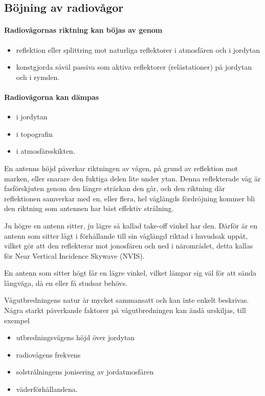\newpage %

\subsection{Böjning av radiovågor}

\paragraph{Radiovågornas riktning kan böjas av genom}
\begin{itemize}
  \item reflektion eller splittring mot naturliga reflektorer i
  atmosfären och i jordytan
  \item konstgjorda såväl passiva som aktiva reflektorer (relästationer)
  på jordytan och i rymden.
\end{itemize}

\paragraph{Radiovågorna kan dämpas}
\begin{itemize}
  \item i jordytan
  \item i topografin
  \item i atmosfärsskikten.
\end{itemize}

En antenns höjd påverkar riktningen av vågen, på grund av reflektion mot
marken, eller snarare den fuktiga delen lite under ytan.
Denna reflekterade våg är fasförskjuten genom den längre sträckan den går,
och den riktning där reflektionen samverkar med en, eller flera, hel våglängds
fördröjning kommer bli den riktning som antennen har bäst effektiv strålning.

Ju högre en antenn sitter, ju lägre så kallad take-off vinkel har den.
Därför är en antenn som sitter lågt i förhållande till sin våglängd riktad i
huvudsak uppåt, vilket gör att den reflekterar mot jonosfären och ned i
närområdet, detta kallas för Near Vertical Incidence Skywave (NVIS).

En antenn som sitter högt får en lägre vinkel, vilket lämpar sig väl för att
sända långväga, då en eller få studsar behövs.

Vågutbredningens natur är mycket sammansatt och kan inte enkelt beskrivas.
Några starkt påverkande faktorer på vågutbredningen kan ändå urskiljas, till exempel
\begin{itemize}
  \item utbredningsvägens höjd över jordytan
  \item radiovågens frekvens
  \item solstrålningens jonisering av jordatmosfären
  \item väderförhållandena.
\end{itemize}

